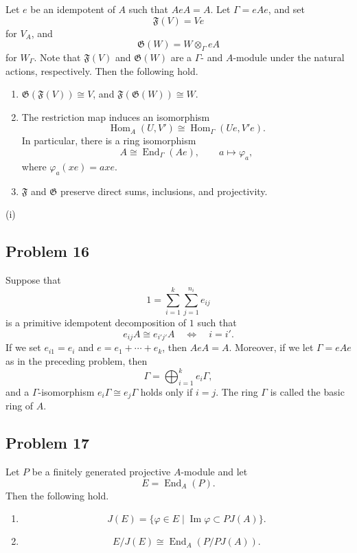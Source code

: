 Let \(e\) be an idempotent of \(A\) such that \(AeA=A\). Let
\(\Gamma=eAe\), and set
\[
\mathfrak{F}(V)=Ve
\]
for \(V_A\), and
\[
\mathfrak{G}(W)=W\otimes_{\Gamma} eA
\]
for \(W_{\Gamma}\). Note that \(\mathfrak{F}(V)\) and \(\mathfrak{G}(W)\) are
a \(\Gamma\)- and \(A\)-module under the natural actions, respectively. Then
the following hold.

\begin{enumerate}
    \item[(i)] \(\mathfrak{G}(\mathfrak{F}(V))\cong V\), and
    \(\mathfrak{F}(\mathfrak{G}(W))\cong W\).

    \item[(ii)] The restriction map induces an isomorphism
    \[
    \operatorname{Hom}_A(U,V')
    \cong
    \operatorname{Hom}_{\Gamma}(Ue,V'e).
    \]
    In particular, there is a ring isomorphism
    \[
    A\cong \operatorname{End}_{\Gamma}(Ae),
    \qquad
    a\longmapsto \varphi_a,
    \]
    where \(\varphi_a(xe)=axe\).

    \item[(iii)] \(\mathfrak{F}\) and \(\mathfrak{G}\) preserve direct sums,
    inclusions, and projectivity.
\end{enumerate}
\begin{solution}
    (i) 
\end{solution}


\subsection{Problem 16}

Suppose that
\[
1=\sum_{i=1}^k\sum_{j=1}^{n_i} e_{ij}
\]
is a primitive idempotent decomposition of \(1\) such that
\[
e_{ij}A\cong e_{i'j'}A
\quad\Longleftrightarrow\quad
i=i'.
\]
If we set \(e_{i1}=e_i\) and \(e=e_1+\cdots+e_k\), then \(AeA=A\).
Moreover, if we let \(\Gamma=eAe\) as in the preceding problem, then
\[
\Gamma=\bigoplus_{i=1}^k e_i\Gamma,
\]
and a \(\Gamma\)-isomorphism \(e_i\Gamma\cong e_j\Gamma\) holds only if
\(i=j\). The ring \(\Gamma\) is called the basic ring of \(A\).

\subsection{Problem 17}

Let \(P\) be a finitely generated projective \(A\)-module and let
\[
E=\operatorname{End}_A(P).
\]
Then the following hold.

\begin{enumerate}
    \item[(i)]
    \[
    J(E)=\{\varphi\in E\mid \operatorname{Im}\varphi\subset PJ(A)\}.
    \]

    \item[(ii)]
    \[
    E/J(E)\cong \operatorname{End}_A(P/PJ(A)).
    \]
\end{enumerate}

